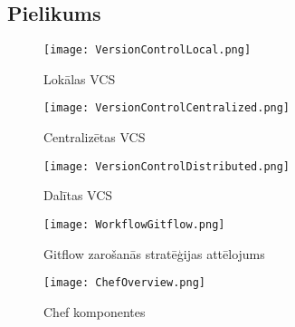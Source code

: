 \begin{appendices}
\chapter{Pielikums}
\label{appx:riceplots}

\begin{figure}[H]%
	\centering
	\captionsetup{justification=centering}
	\texttt{[image: VersionControlLocal.png]}
	\caption{Lokālas VCS}
	\label{appfig:VersionControlLocal}
\end{figure}

\begin{figure}[H]%
	\centering
	\captionsetup{justification=centering}
	\texttt{[image: VersionControlCentralized.png]}
	\caption{Centralizētas VCS}
	\label{appfig:VersionControlCentralized}
\end{figure}

\begin{figure}[H]%
	\centering
	\captionsetup{justification=centering}
	\texttt{[image: VersionControlDistributed.png]}
	\caption{Dalītas VCS}
	\label{appfig:VersionControlDistributed}
\end{figure}

\begin{figure}[H]%
	\centering
	\captionsetup{justification=centering}
	\texttt{[image: WorkflowGitflow.png]}
	\caption{Gitflow zarošanās stratēģijas attēlojums}
	\label{appfig:WorkflowGitflow}
\end{figure}

\begin{figure}[H]%
	\centering
	\captionsetup{justification=centering}
	\texttt{[image: ChefOverview.png]}
	\caption{Chef komponentes}
	\label{appfig:ChefOverview}
\end{figure}
\end{appendices}